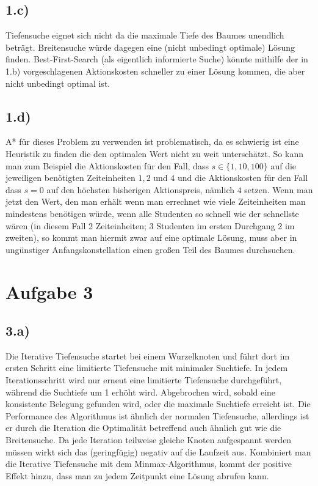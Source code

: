 \documentclass[a4paper]{article}
\begin{document}
\subsection*{1.c)}
Tiefensuche eignet sich nicht da die maximale Tiefe des Baumes unendlich beträgt. Breitensuche würde dagegen eine (nicht unbedingt optimale) Lösung finden. Best-First-Search (als eigentlich informierte Suche) könnte mithilfe der in 1.b) vorgeschlagenen Aktionskosten schneller zu einer Lösung kommen, die aber nicht unbedingt optimal ist.

\subsection*{1.d)}
A* für dieses Problem zu verwenden ist problematisch, da es schwierig ist eine Heuristik zu finden die den optimalen Wert nicht zu weit unterschätzt. So kann man zum Beispiel die Aktionskosten für den Fall, dass $s \in \{1,10,100\}$ auf die jeweiligen benötigten Zeiteinheiten $1, 2$ und $4$ und die Aktionskosten für den Fall dass $s=0$ auf den höchsten bisherigen Aktionspreis, nämlich $4$ setzen. Wenn man jetzt den Wert, den man erhält wenn man errechnet wie viele Zeiteinheiten man mindestens benötigen würde, wenn alle Studenten so schnell wie der schnellste wären (in diesem Fall 2 Zeiteinheiten; 3 Studenten im ersten Durchgang 2 im zweiten), so kommt man hiermit zwar auf eine optimale Lösung, muss aber in ungünstiger Anfangskonstellation einen großen Teil des Baumes durchsuchen.

\section*{Aufgabe 3}
\subsection*{3.a)}
Die Iterative Tiefensuche startet bei einem Wurzelknoten und führt dort im ersten Schritt eine limitierte Tiefensuche mit minimaler Suchtiefe. In jedem Iterationsschritt wird nur erneut eine limitierte Tiefensuche durchgeführt, während die Suchtiefe um 1 erhöht wird. Abgebrochen wird, sobald eine konsistente Belegung gefunden wird, oder die maximale Suchtiefe erreicht ist. Die Performance des Algorithmus ist ähnlich der normalen Tiefensuche, allerdings ist er durch die Iteration die Optimalität betreffend auch ähnlich gut wie die Breitensuche.
Da jede Iteration teilweise gleiche Knoten aufgespannt werden müssen wirkt sich das (geringfügig) negativ auf die Laufzeit aus. Kombiniert man die Iterative Tiefensuche mit dem Minmax-Algorithmus, kommt der positive Effekt hinzu, dass man zu jedem Zeitpunkt eine Lösung abrufen kann.
\end{document}

